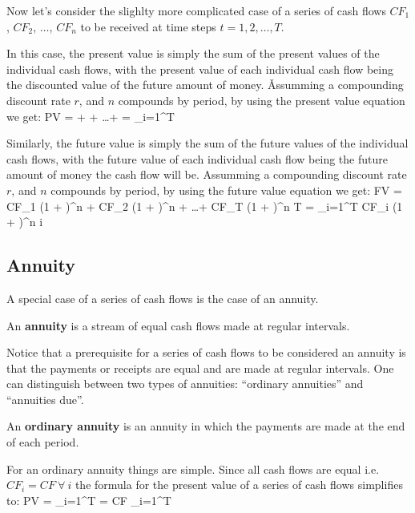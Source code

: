 Now let's consider the slighlty more complicated case of a series of cash flows $CF_1$, $CF_2$, $\ldots$, $CF_n$ to be
received at time steps $t=1, 2, \ldots, T$.


In this case, the present value is simply the sum of the present values of the individual cash flows, with the present
value of each individual cash flow being the discounted value of the future amount of money. \v

Assumming a compounding discount rate $r$, and $n$ compounds by period, by using the present value equation we get:
\bse \label{eq:pv_series}
PV =  +  + \ldots +  = \sum_{i=1}^T 
\ese

Similarly, the future value is simply the sum of the future values of the individual cash flows, with the future value
of each individual cash flow being the future amount of money the cash flow will be. Assumming a compounding
discount rate $r$, and $n$ compounds by period, by using the future value equation we get:
\bse
FV = CF_1 \cdot (1 + )^{n } + CF_2 \cdot (1 + )^{n } + \ldots + CF_T \cdot (1 + )^{n \cdot T} = \sum_{i=1}^T CF_i \cdot (1 + )^{n \cdot i}
\ese

\subsection{Annuity}

A special case of a series of cash flows is the case of an annuity.

\bd[Annunity]
An \textbf{annuity} is a stream of equal cash flows made at regular intervals.
\ed

Notice that a prerequisite for a series of cash flows to be considered an annuity is that the payments or receipts are
equal and are made at regular intervals. One can distinguish between two types of annuities: ``ordinary annuities'' and
``annuities due''.

An \textbf{ordinary annuity} is an annuity in which the payments are made at the end of each period.
\ed


For an ordinary annuity things are simple. Since all cash flows are equal i.e.\ $CF_i = CF \: \forall \: i$ the formula for
the present value of a series of cash flows simplifies to:
\bse
PV = \sum_{i=1}^T  = CF \cdot \sum_{i=1}^T 
\ese

